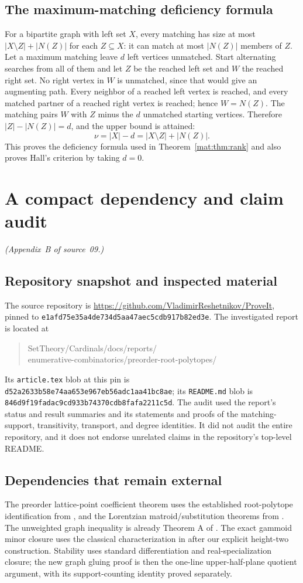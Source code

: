 \documentclass[11pt]{article}
\numberwithin{equation}{section}
\theoremstyle{definition}
\begin{document}
\subsection{The maximum-matching deficiency formula}
For a bipartite graph with left set $X$, every matching has size at most
$|X\setminus Z|+|N(Z)|$ for each $Z\subseteq X$: it can match at most
$|N(Z)|$ members of $Z$. Let a maximum matching leave $d$ left vertices
unmatched. Start alternating searches from all of them and let $Z$ be the
reached left set and $W$ the reached right set. No right vertex in $W$ is
unmatched, since that would give an augmenting path. Every neighbor of a
reached left vertex is reached, and every matched partner of a reached
right vertex is reached; hence $W=N(Z)$. The matching pairs $W$ with
$Z$ minus the $d$ unmatched starting vertices. Therefore
$|Z|-|N(Z)|=d$, and the upper bound is attained:
\[
 \nu=|X|-d=|X\setminus Z|+|N(Z)|.
\]
This proves the deficiency formula used in Theorem~\ref{mat:thm:rank} and also
proves Hall's criterion by taking $d=0$.

\section{A compact dependency and claim audit}
\label{mat:app:audit}
\noindent\emph{(Appendix~B of source~09.)}
\subsection{Repository snapshot and inspected material}
The source repository is \url{https://github.com/VladimirReshetnikov/ProveIt},
pinned to \texttt{e1afd75e35a4de734d5aa47aec5cdb917b82ed3e}. The investigated report is located at
\begin{quote}\small\ttfamily
SetTheory/Cardinals/docs/reports/\\
enumerative-combinatorics/preorder-root-polytopes/
\end{quote}
Its \texttt{article.tex} blob at this pin is
\texttt{d52a2633b58e74aa653e967eb56adc1aa41bc8ae}; its
\texttt{README.md} blob is
\texttt{846d9f19fadac9cd933b74370cdb8fafa2211c5d}.
The audit used the report's status and result summaries and its statements
and proofs of the matching-support, transitivity, transport, and degree
identities. It did not audit the entire repository, and it does not endorse
unrelated claims in the repository's top-level README.

\subsection{Dependencies that remain external}
The preorder lattice-point coefficient theorem uses the established
root-polytope identification from \cite{DHLTW,DK}, and the Lorentzian
matroid/substitution theorems from \cite{BH}. The unweighted graph
inequality is already Theorem A of \cite{RU}. The exact gammoid minor
closure uses the classical characterization in \cite{IP} after our
explicit height-two construction. Stability uses standard differentiation
and real-specialization closure; the new graph gluing proof is then the
one-line upper-half-plane quotient argument, with its support-counting
identity proved separately.
\end{document}

